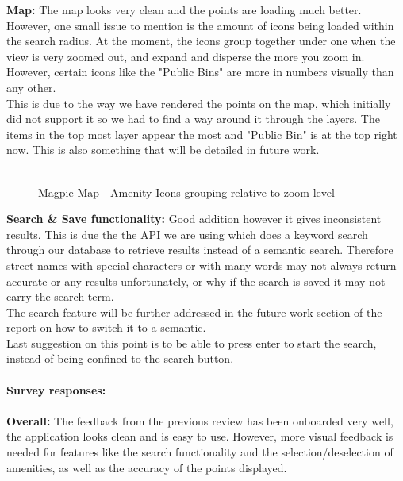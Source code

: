\newpage
\noindent\textbf{Map: }
The map looks very clean and the points are loading much better. However, one small issue to mention is the amount of icons being loaded within the search radius. At the moment, the icons group together under one when the view is very zoomed out, and expand and disperse the more you zoom in. However, certain icons like the "Public Bins" are more in numbers visually than any other.\\
This is due to the way we have rendered the points on the map, which initially did not support it so we had to find a way around it through the layers. The items in the top most layer appear the most and "Public Bin" is at the top right now. This is also something that will be detailed in future work.\\\\
\begin{figure}
    \centering
    \caption{Magpie Map - Amenity Icons grouping relative to zoom level}
\end{figure}
\newpage
\textbf{Search \& Save functionality: }
Good addition however it gives inconsistent results. This is due the the API we are using which does a keyword search through our database to retrieve results instead of a semantic search. Therefore street names with special characters or with many words may not always return accurate or any results unfortunately, or why if the search is saved it may not carry the search term.\\
The search feature will be further addressed in the future work section of the report on how to switch it to a semantic.\\
Last suggestion on this point is to be able to press enter to start the search, instead of being confined to the search button.\\\\
\textbf{Survey responses:}\\\\
\textbf{Overall: }
The feedback from the previous review has been onboarded very well, the application looks clean and is easy to use. However, more visual feedback is needed for features like the search functionality and the selection/deselection of amenities, as well as the accuracy of the points displayed.